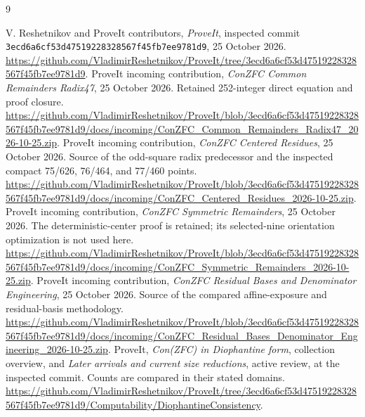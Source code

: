 \documentclass[11pt]{article}
\theoremstyle{definition}\newtheorem{definition}[theorem]{Definition}
\begin{document}
\begin{thebibliography}{9}\raggedright\small
{}
V. Reshetnikov and ProveIt contributors, \emph{ProveIt}, inspected commit
\texttt{3ecd6a6cf53d47519228328567f45fb7ee9781d9}, 25 October 2026.
\url{https://github.com/VladimirReshetnikov/ProveIt/tree/3ecd6a6cf53d47519228328567f45fb7ee9781d9}.
ProveIt incoming contribution, \emph{ConZFC Common Remainders Radix47},
25 October 2026. Retained 252-integer direct equation and proof closure.
\url{https://github.com/VladimirReshetnikov/ProveIt/blob/3ecd6a6cf53d47519228328567f45fb7ee9781d9/docs/incoming/ConZFC_Common_Remainders_Radix47_2026-10-25.zip}.
ProveIt incoming contribution, \emph{ConZFC Centered Residues},
25 October 2026. Source of the odd-square radix predecessor and the
inspected compact 75/626, 76/464, and 77/460 points.
\url{https://github.com/VladimirReshetnikov/ProveIt/blob/3ecd6a6cf53d47519228328567f45fb7ee9781d9/docs/incoming/ConZFC_Centered_Residues_2026-10-25.zip}.
ProveIt incoming contribution, \emph{ConZFC Symmetric Remainders},
25 October 2026. The deterministic-center proof is retained; its
selected-nine orientation optimization is not used here.
\url{https://github.com/VladimirReshetnikov/ProveIt/blob/3ecd6a6cf53d47519228328567f45fb7ee9781d9/docs/incoming/ConZFC_Symmetric_Remainders_2026-10-25.zip}.
ProveIt incoming contribution, \emph{ConZFC Residual Bases and Denominator
Engineering}, 25 October 2026. Source of the compared affine-exposure
and residual-basis methodology.
\url{https://github.com/VladimirReshetnikov/ProveIt/blob/3ecd6a6cf53d47519228328567f45fb7ee9781d9/docs/incoming/ConZFC_Residual_Bases_Denominator_Engineering_2026-10-25.zip}.
ProveIt, \emph{Con(ZFC) in Diophantine form}, collection overview,
and \emph{Later arrivals and current size reductions}, active review,
at the inspected commit. Counts are compared in their stated domains.
\url{https://github.com/VladimirReshetnikov/ProveIt/tree/3ecd6a6cf53d47519228328567f45fb7ee9781d9/Computability/DiophantineConsistency}.
\end{thebibliography}
\appendix
\end{document}

